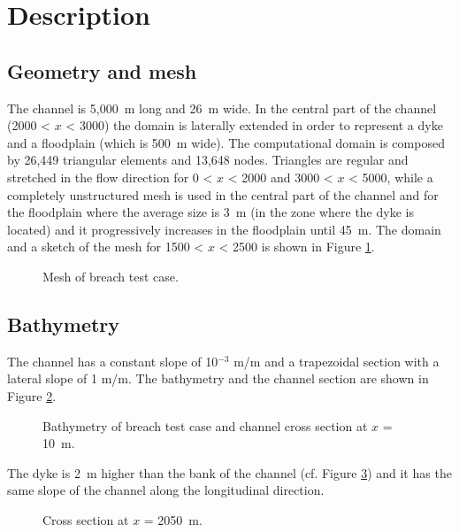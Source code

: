 \section{Description}
\subsection{Geometry and mesh}
The channel is 5,000~m long and 26~m wide. In the central part of the channel
(2000 < $x$ < 3000) the domain is laterally extended in order to represent a
dyke and a floodplain (which is 500~m wide). The computational domain is
composed by 26,449 triangular elements and 13,648 nodes. Triangles are regular
and stretched in the flow direction for 0 < $x$ < 2000 and 3000 < $x$ < 5000,
while a completely unstructured mesh is used in the central part of the channel
and for the floodplain where the average size is 3~m (in the zone where the
dyke is located) and it progressively increases in the floodplain until 45~m.
The domain and a sketch of the mesh for 1500 < $x$ < 2500 is shown in Figure
\ref{fig:breach:mesh}.
\begin{figure}[H]
  \centering
  \caption{Mesh of breach test case.}\label{fig:breach:mesh}
\end{figure}

\subsection{Bathymetry}
The channel has a constant slope of 10$^{-3}$ m/m and a trapezoidal section
with a lateral slope of 1 m/m. The bathymetry and the channel section are shown
in Figure \ref{fig:breach:bottom}.
\begin{figure}[H]
  \centering
  \caption{Bathymetry of breach test case and channel cross section at $x$ = 10~m.}
  \label{fig:breach:bottom}
\end{figure}

The dyke is 2~m higher than the bank of the channel (cf. Figure
\ref{fig:breach:dyke:sect}) and it has the same slope of the channel along the
longitudinal direction.
\begin{figure}[H]
  \centering
  \caption{Cross section at $x$ = 2050~m.}\label{fig:breach:dyke:sect}
\end{figure}

